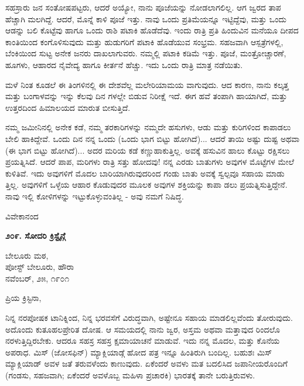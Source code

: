 ಸಹಸ್ರಾರು ಜನ ಸಂತೋಷಪಟ್ಟರು, ಆದರೆ ಅಯ್ಯೋ, ನಾನು ಪೂಜೆಯನ್ನು ನೋಡಲಾಗಲಿಲ್ಲ. ಆಗ ಜ್ವರದ ತಾಪ ಹೆಚ್ಚಾಗಿ ಮಲಗಿದ್ದೆ. ಆದರೆ, ಮೊನ್ನೆ ಕಾಳಿ ಪೂಜೆ ಇತ್ತು. ನಾವು ಒಂದು ಪ್ರತಿಮೆಯನ್ನೂ ಇಟ್ಟಿದ್ದೆವು, ಮತ್ತು ಒಂದು ಆಡನ್ನು ಬಲಿ ಕೊಟ್ಟೆವು ಹಾಗೂ ಒಂದು ರಾಶಿ ಪಟಾಕಿ ಹೊಡೆದೆವು. ಇಂದು ರಾತ್ರಿ ಪ್ರತಿ ಹಿಂದುವಿನ ಮನೆಯೂ ದೀಪದ ಕಾಂತಿಯಿಂದ ಕಂಗೊಳಿಸುವುದು ಮತ್ತು ಹುಡುಗರಿಗೆ ಪಟಾಕಿ ಹೊಡೆಯುವ ಸಂಭ್ರಮ. ಸಹಜವಾಗಿ ಆಸ್ಪತ್ರೆಗಳಲ್ಲಿ, ಬೆಂಕಿಯಿಂದ ಸುಟ್ಟ ಅನೇಕ ಜನರು ದಾಖಲಾಗುವರು. ನಮ್ಮಲ್ಲಿ ಪಟಾಕಿ ಕಡಿಮೆ ಇತ್ತು. ಪೂಜೆ, ಮಂತ್ರೋಚ್ಚಾರಣೆ, ಹೂಗಳು, ಆಹಾರದ ನೈವೇದ್ಯ ಹಾಗೂ ಕೀರ್ತನೆ ಹೆಚ್ಚು. ಇದು ಒಂದು ರಾತ್ರಿ ಮಾತ್ರ ನಡೆಯಿತು.

ಮಳೆ ನಿಂತ ಕೂಡಲೆ ಈ ತಿಂಗಳಿನಲ್ಲಿ ಈ ದೇಶವೆಲ್ಲ ಮಲೇರಿಯಾಮಯ ವಾಗುವುದು. ಆದ ಕಾರಣ, ನಾನು ಕಲ್ಕತ್ತ ಮತ್ತು ಬಂಗಾಳವನ್ನು ಇನ್ನು ಕೆಲವು ದಿನ ಗಳಲ್ಲೇ ಬಿಡುವ ನಿರೀಕ್ಷೆ ಇದೆ. ಈಗ ಹವೆ ತಂಪಾಗಿ ಹಾಯಾಗಿದೆ, ಮತ್ತು ಉತ್ತರದಿಂದ ಹಿಮಾಲಯದ ಮಾರುತ ಬೀಸುತ್ತಿದೆ.

ನಮ್ಮ ಜಮೀನಿನಲ್ಲಿ ಅನೇಕ ಕಡೆ, ನಮ್ಮ ತರಕಾರಿಗಳನ್ನು ನಮ್ಮದೇ ಹಸುಗಳು, ಆಡು ಮತ್ತು ಕುರಿಗಳಿಂದ ಕಾಪಾಡಲು ಬೇಲಿ ಹಾಕಿದ್ದೇವೆ. ಒಂದು ದಿನ ನನ್ನ ಒಂದು (ಒಂದು ಭಾಗ ಬಿಟ್ಟು ಹೋಗಿದೆ)... ಆದರೆ ತಾಯಿ ಅಷ್ಟು ದುಷ್ಟ ಅಥವಾ (ಈ ಭಾಗ ಬಿಟ್ಟು ಹೋಗಿದೆ)... ಅದರ ಮರಿಯ ಕಡೆ ಕಣ್ಣುಹಾಕುತ್ತಿಲ್ಲ. ಅವಕ್ಕೆ ಹಸುವಿನ ಹಾಲು ಕೊಟ್ಟು ರಕ್ಷಿಸಲು ಪ್ರಯತ್ನಿಸಿದೆ. ಆದರೆ ಪಾಪ, ಮರಿಗಳು ರಾತ್ರಿ ಸತ್ತು ಹೋದವು! ನನ್ನ ಎರಡು ಬಾತುಗಳು ಅವುಗಳ ಮೊಟ್ಟೆಗಳ ಮೇಲೆ ಕುಳಿತಿವೆ. ಇದು ಅವುಗಳಿಗೆ ಮೊದಲ ಬಾರಿಯಾಗಿರುವುದರಿಂದ ಗಂಡು ಬಾತು ಅವಕ್ಕೆ ಸ್ವಲ್ಪವೂ ಸಹಾಯ ಮಾಡು ತ್ತಿಲ್ಲ. ಅವುಗಳಿಗೆ ಒಳ್ಳೆಯ ಆಹಾರ ಕೊಡುವುದರ ಮೂಲಕ ಅವುಗಳ ಶಕ್ತಿಯನ್ನು ಕಾಪಾ ಡಲು ಪ್ರಯತ್ನಿಸುತ್ತಿದ್ದೇನೆ. ನಾವು ಇಲ್ಲಿ ಕೋಳಿಗಳನ್ನು ಇಟ್ಟುಕೊಳ್ಳುವಂತಿಲ್ಲ - ಅವು ನಮಗೆ ನಿಷಿದ್ಧ.

\begin{flushright}
ವಿವೇಕಾನಂದ
\end{flushright}

\begin{center}
\textbf{೨೦೯. ಸೋದರಿ ಕ್ರಿಸ್ಟೈನ್ಗೆ}
\end{center}

\begin{flushright}
ಬೇಲೂರು ಮಠ,\\ಪೋಸ್ಟ್ ಬೇಲೂರು, ಹೌರಾ\\ನವೆಂಬರ್, ೨೫, ೧೯೦೧
\end{flushright}

ಪ್ರಿಯ ಕ್ರಿಸ್ಟಿನಾ,

ನಿನ್ನ ನರಪೋಷಕ ಟಾನಿಕ್ನಿಂದ, ನಿನ್ನ ಭರವಸೆಗೆ ವಿರುದ್ಧವಾಗಿ, ಅಷ್ಟೇನೂ ಸಹಾಯ ಮಾಡಲಿಲ್ಲವೆಂದು ತೋರುವುದು. ಅದೊಂದು ಕುತೂಹಲಪ್ರೇರಿತ ದೋಷ. ಆ ಸಮಯದಲ್ಲಿ ನಾನು ಜ್ವರ, ಅಸ್ತಮ ಅಥವಾ ಮತ್ತಾವುದ ರಿಂದಲೊ ನರಳುತ್ತಿದ್ದಿರಬೇಕು. ಆದರೂ ಸಹಸ್ರ ಸಹಸ್ರ ಕ್ಷಮಾಯಾಚನೆ ಮಾಡುವೆ. ಇದು ನನ್ನ ಮೊದಲ, ಮತ್ತು ಕೊನೆಯ ಅಪರಾಧ. ಮಿಸ್ (ಜೋಸಫಿನ್) ಮ್ಯಾಕ್ಲಿಯಾಡ್ಗೆ ಹೋದ ಪತ್ರ ಇನ್ನೂ ಹಿಂತಿರುಗಿ ಬಂದಿಲ್ಲ. ಬಹುಶಃ ಮಿಸ್ ಮ್ಯಾಕ್ಲಿಯಾಡ್ ಅವಳ ಜತೆ ತರುವಳೆಂದು ಕಾಣುವುದು. ಏಕೆಂದರೆ ಅವಳು ಮತ ಬದಲಿಸಿದ ಜಪಾನೀಯರೊಂದಿಗೆ (ಗಂಡಸು, ಸಹಜವಾಗಿ; ಏಕೆಂದರೆ ಅವಳೊಬ್ಬ ಮಹಿಳಾ ಪ್ರಚಾರಕಿ) ಭಾರತಕ್ಕೆ ತಾನೇ ಬರುತ್ತಿರುವಳು.

